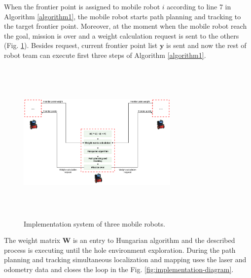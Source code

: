 \documentclass[letterpaper, 10 pt, conference]{ieeeconf}  %
\begin{document}
When the frontier point is assigned to mobile robot $i$ according to line 7 in Algorithm \ref{algorithm1}, the mobile robot starts path planning and tracking to the target frontier point. Moreover, at the moment when the mobile robot reach the goal, mission is over and a weight calculation request is sent to the others (Fig. \ref{fig:sustav3}). Besides request, current frontier point list $\boldsymbol{y}$ is sent and now the rest of robot team can execute first three steps of Algorithm \ref{algorithm1}.    

\begin{figure}[t!]
    \centering\includegraphics[width=0.7\textwidth,height=8cm]{structure.png}
	\caption{Implementation system of three mobile robots.}
    \label{fig:sustav3}
\end{figure}


The weight matrix $\boldsymbol{W}$ is an entry to Hungarian algorithm and the described process is executing until the hole environment exploration. During the path planning and tracking simultaneous localization and mapping uses the laser and odometry data and closes the loop in the Fig. \ref{fig:implementation-diagram}.
\end{document}
